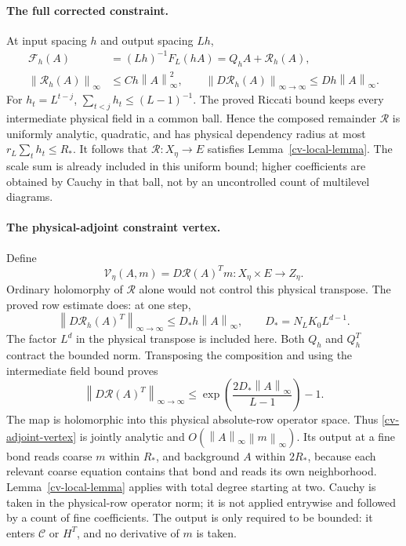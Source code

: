 \documentclass[11pt]{article}
\theoremstyle{remark}
\newcommand{\norm}[1]{\left\|#1\right\|}
\begin{document}
\paragraph{The full corrected constraint.}
At input spacing $h$ and output spacing $Lh$,
\begin{equation}\label{cv-one-step}
 \begin{split}
 \mathcal F_h(A)&=(Lh)^{-1}F_L(hA)=Q_hA+\mathcal R_h(A),\\
 \norm{\mathcal R_h(A)}_\infty&\le Ch\norm A_\infty^2,
 \qquad
 \norm{D\mathcal R_h(A)}_{\infty\to\infty}
       \le Dh\norm A_\infty.
 \end{split}
\end{equation}
For $h_t=L^{t-j}$, $\sum_{t<j}h_t\le(L-1)^{-1}$.
The proved Riccati bound keeps every intermediate physical
field in a common ball. Hence the composed remainder
$\mathcal R$ is uniformly analytic, quadratic, and has
physical dependency radius at most
$r_L\sum_th_t\le R_*$.
It follows that $\mathcal R:X_\eta\to E$ satisfies
Lemma~\ref{cv-local-lemma}. The scale sum is already included
in this uniform bound; higher coefficients are obtained by
Cauchy in that ball, not by an uncontrolled count of
multilevel diagrams.

\paragraph{The physical-adjoint constraint vertex.}
Define
\begin{equation}\label{cv-adjoint-vertex}
 \mathcal V_\eta(A,m)=D\mathcal R(A)^Tm:
                X_\eta\times E\longrightarrow Z_\eta.
\end{equation}
Ordinary holomorphy of $\mathcal R$ alone would not control
this physical transpose. The proved row estimate does:
at one step,
\[
 \norm{D\mathcal R_h(A)^T}_{\infty\to\infty}
       \le D_*h\norm A_\infty,\qquad
 D_*=N_LK_0L^{d-1}.
\]
The factor $L^d$ in the physical transpose is included here.
Both $Q_h$ and $Q_h^T$ contract the bounded norm.
Transposing the composition and using the intermediate
field bound proves
\begin{equation}\label{cv-adjoint-bound}
 \norm{D\mathcal R(A)^T}_{\infty\to\infty}
    \le \exp\left(\frac{2D_*\norm A_\infty}{L-1}\right)-1.
\end{equation}
The map is holomorphic into this physical absolute-row
operator space. Thus \eqref{cv-adjoint-vertex} is jointly
analytic and $O(\norm A_\infty\norm m_\infty)$.
Its output at a fine bond reads coarse $m$ within $R_*$,
and background $A$ within $2R_*$, because each relevant
coarse equation contains that bond and reads its own
neighborhood. Lemma~\ref{cv-local-lemma} applies with
total degree starting at two. Cauchy is taken in the
physical-row operator norm; it is not applied entrywise
and followed by a count of fine coefficients.
The output is only required to be bounded: it enters
$\mathcal C$ or $H^T$, and no derivative of $m$ is taken.
\end{document}
